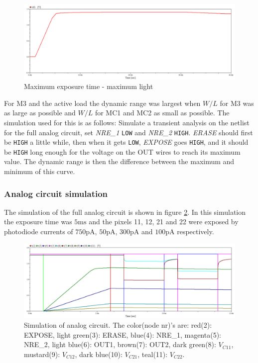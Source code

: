 \begin{figure}
    \centering
    \includegraphics[width=\textwidth]{graphs/maxExp_maxLight.png}
    \caption{Maximum exposure time - maximum light}
    \label{fig:max-max}
\end{figure}

For M3 and the active load the dynamic range was largest when $W/L$ for M3 was as large as possible and $W/L$ for MC1 and MC2 as small as possible. The simulation used for this is as follows: Simulate a transient analysis on the netlist for the full analog circuit, set \emph{NRE\_1} \verb|LOW| and \emph{NRE\_2} \verb|HIGH|. \emph{ERASE} should first be \verb|HIGH| a little while, then when it gets \verb|LOW|, \emph{EXPOSE} goes \verb|HIGH|, and it should be \verb|HIGH| long enough for the voltage on the OUT wires to reach its maximum value. The dynamic range is then the difference between the maximum and minimum of this curve.

\subsubsection{Analog circuit simulation}

The simulation of the full analog circuit is shown in figure \ref{fig:analogWaveform}. In this simulation the exposure time was $5 \mathrm{ms}$ and the pixels 11, 12, 21 and 22 were exposed by photodiode currents of $750 \mathrm{pA}$, $50 \mathrm{pA}$, $300 \mathrm{pA}$ and $100 \mathrm{pA}$ respectively.

\begin{figure}
    \centering
    \includegraphics[width=\textwidth]{graphs/analogWaveform.png}
    \caption{Simulation of analog circuit. The color(node nr)'s are: red(2): EXPOSE, light green(3): ERASE, blue(4): NRE\_1, magenta(5): NRE\_2, light blue(6): OUT1, brown(7): OUT2, dark green(8): $V_{C11}$, mustard(9): $V_{C12}$, dark blue(10): $V_{C21}$, teal(11): $V_{C22}$.}
    \label{fig:analogWaveform}
\end{figure}

